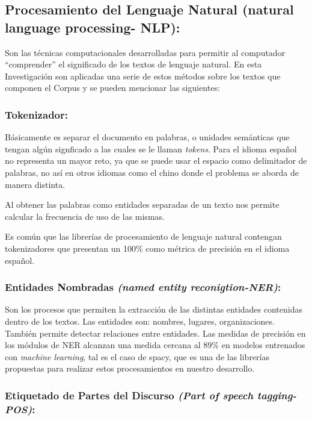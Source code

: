 \documentclass[
  10,
  openany]{book}
\begin{document}
\hypertarget{nlproc}{%
\subsection{Procesamiento del Lenguaje Natural (natural language processing- NLP):}\label{nlproc}}

Son las técnicas computacionales desarrolladas para permitir al computador ``comprender'' el significado de los textos de lenguaje natural. En esta Investigación son aplicadas una serie de estos métodos sobre los textos que componen el Corpus y se pueden mencionar las siguientes:

\hypertarget{token}{%
\subsubsection{Tokenizador:}\label{token}}

Básicamente es separar el documento en palabras, o unidades semánticas que tengan algún signficado a las cuales se le llaman \emph{tokens}. Para el idioma español no representa un mayor reto, ya que se puede usar el espacio como delimitador de palabras, no así en otros idiomas como el chino donde el problema se aborda de manera distinta.

Al obtener las palabras como entidades separadas de un texto nos permite calcular la frecuencia de uso de las mismas.

Es común que las librerías de procesamiento de lenguaje natural contengan tokenizadores que presentan un 100\% como métrica de precisión en el idioma español.

\hypertarget{ner}{%
\subsubsection{\texorpdfstring{Entidades Nombradas \emph{(named entity reconigtion-NER)}:}{Entidades Nombradas (named entity reconigtion-NER):}}\label{ner}}

Son los procesos que permiten la extracción de las distintas entidades contenidas dentro de los textos. Las entidades son: nombres, lugares, organizaciones. También permite detectar relaciones entre entidades. Las medidas de precisión en los módulos de NER alcanzan una medida cercana al 89\% en modelos entrenados con \emph{machine learning}, tal es el caso de spacy, que es una de las librerías propuestas para realizar estos procesamientos en nuestro desarrollo.

\hypertarget{pos}{%
\subsubsection{\texorpdfstring{Etiquetado de Partes del Discurso \emph{(Part of speech tagging-POS)}:}{Etiquetado de Partes del Discurso (Part of speech tagging-POS):}}\label{pos}}
\end{document}
